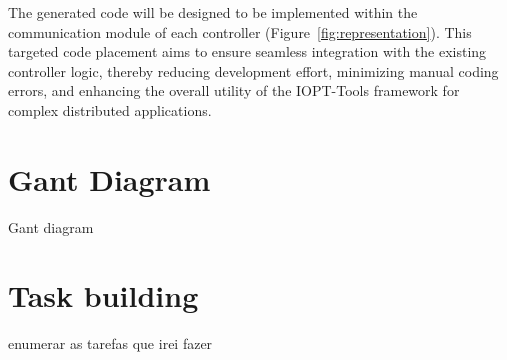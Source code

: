  
The generated code will be designed to be implemented within the communication module of each controller (Figure~\ref{fig:representation}). This targeted code placement aims to ensure seamless integration with the existing controller logic, thereby reducing development effort, minimizing manual coding errors, and enhancing the overall utility of the IOPT-Tools framework for complex distributed applications.



 
 
 
\section{Gant Diagram }
\label{sec:gant_diagram}

Gant diagram

\section{Task building}
\label{sec:task_building}

enumerar as tarefas que irei fazer
